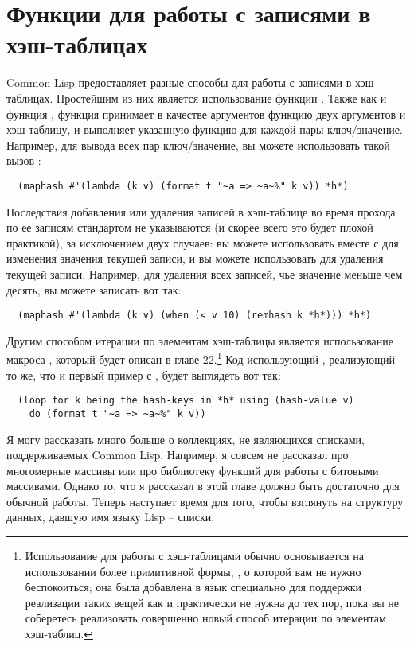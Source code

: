 \section{Функции для работы с записями в хэш-таблицах}

Common Lisp предоставляет разные способы для работы с записями в хэш-таблицах.  Простейшим
из них является использование функции .  Также как и функция ,
функция  принимает в качестве аргументов функцию двух аргументов и
хэш-таблицу, и выполняет указанную функцию для каждой пары ключ/значение.  Например, для
вывода всех пар ключ/значение, вы можете использовать такой вызов :

\begin{verbatim}
  (maphash #'(lambda (k v) (format t "~a => ~a~%" k v)) *h*)
\end{verbatim}

Последствия добавления или удаления записей в хэш-таблице во время прохода по ее записям
стандартом не указываются (и скорее всего это будет плохой практикой), за исключением двух
случаев: вы можете использовать  вместе с  для изменения значения
текущей записи, и вы можете использовать  для удаления текущей записи.
Например, для удаления всех записей, чье значение меньше чем десять, вы можете записать
вот так:

\begin{verbatim}
  (maphash #'(lambda (k v) (when (< v 10) (remhash k *h*))) *h*)
\end{verbatim}

Другим способом итерации по элементам хэш-таблицы является использование макроса
, который будет описан в главе 22.\footnote{Использование  для
  работы с хэш-таблицами обычно основывается на использовании более примитивной формы,
  , о которой вам не нужно беспокоиться; она была добавлена
  в язык специально для поддержки реализации таких вещей как  и практически не
  нужна до тех пор, пока вы не соберетесь реализовать совершенно новый способ итерации по
  элементам хэш-таблиц.}  Код использующий , реализующий то же, что и первый
пример с , будет выглядеть вот так:

\begin{lstlisting}  
  (loop for k being the hash-keys in *h* using (hash-value v)
    do (format t "~a => ~a~%" k v))
\end{lstlisting}

Я могу рассказать много больше о коллекциях, не являющихся списками, поддерживаемых Common
Lisp.  Например, я совсем не рассказал про многомерные массивы или про библиотеку функций
для работы с битовыми массивами.  Однако то, что я рассказал в этой главе должно быть
достаточно для обычной работы.  Теперь наступает время для того, чтобы взглянуть на
структуру данных, давшую имя языку Lisp -- списки.

